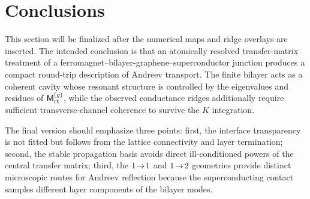 \section{Conclusions}
\label{sec:conclusions}

This section will be finalized after the numerical maps and ridge overlays are inserted.  The intended conclusion is that an atomically resolved transfer-matrix treatment of a ferromagnet--bilayer-graphene--superconductor junction produces a compact round-trip description of Andreev transport.  The finite bilayer acts as a coherent cavity whose resonant structure is controlled by the eigenvalues and residues of $\mathsf M_{\mathrm{rt}}^{(g)}$, while the observed conductance ridges additionally require sufficient transverse-channel coherence to survive the $K$ integration.

The final version should emphasize three points: first, the interface transparency is not fitted but follows from the lattice connectivity and layer termination; second, the stable propagation basis avoids direct ill-conditioned powers of the central transfer matrix; third, the $1\!\to\!1$ and $1\!\to\!2$ geometries provide distinct microscopic routes for Andreev reflection because the superconducting contact samples different layer components of the bilayer modes.
